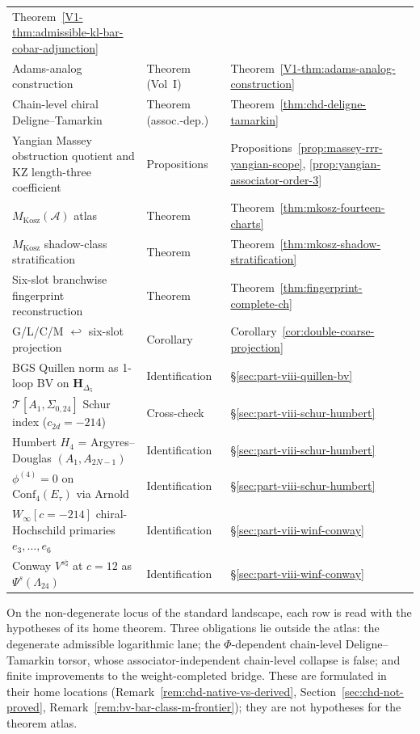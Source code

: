 \begin{center}
\begin{tabular}{@{}p{}p{}p{}@{}}
 Theorem~\ref*{V1-thm:admissible-kl-bar-cobar-adjunction} \\
Adams-analog construction & Theorem (Vol~I) &
 Theorem~\ref*{V1-thm:adams-analog-construction} \\
Chain-level chiral Deligne--Tamarkin & Theorem (assoc.-dep.) &
 Theorem~\ref{thm:chd-deligne-tamarkin} \\
Yangian Massey obstruction quotient and KZ length-three coefficient &
 Propositions &
 Propositions~\ref{prop:massey-rrr-yangian-scope},
 \ref{prop:yangian-associator-order-3} \\
$M_{\mathrm{Kosz}}(\mathcal{A})$ atlas & Theorem &
 Theorem~\ref{thm:mkosz-fourteen-charts} \\
$M_{\mathrm{Kosz}}$ shadow-class stratification & Theorem &
 Theorem~\ref{thm:mkosz-shadow-stratification} \\
Six-slot branchwise fingerprint reconstruction & Theorem &
 Theorem~\ref{thm:fingerprint-complete-ch} \\
G/L/C/M $\hookleftarrow$ six-slot projection & Corollary &
 Corollary~\ref{cor:double-coarse-projection} \\
BGS Quillen norm as 1-loop BV on $\mathbf{H}_{\Delta_5}$ &
 Identification &
 \S\ref{sec:part-viii-quillen-bv} \\
$\mathcal{T}[A_1,\Sigma_{0,24}]$ Schur index ($c_{2d} = -214$) &
 Cross-check &
 \S\ref{sec:part-viii-schur-humbert} \\
Humbert $H_4$ = Argyres--Douglas $(A_1, A_{2N-1})$ &
 Identification &
 \S\ref{sec:part-viii-schur-humbert} \\
$\phi^{(4)} = 0$ on $\mathrm{Conf}_4(E_\tau)$ via Arnold &
 Identification &
 \S\ref{sec:part-viii-schur-humbert} \\
$W_\infty[c=-214]$ chiral-Hochschild primaries $e_3,\ldots,e_6$ &
 Identification &
 \S\ref{sec:part-viii-winf-conway} \\
Conway $V^{s\natural}$ at $c = 12$ as $\Psi^s(\Lambda_{24})$ &
 Identification &
 \S\ref{sec:part-viii-winf-conway} \\
\bottomrule
\end{tabular}
\end{center}

On the non-degenerate locus of the standard landscape, each row is
read with the hypotheses of its home theorem. Three obligations lie
outside the atlas: the degenerate admissible logarithmic lane; the
\(\Phi\)-dependent chain-level Deligne--Tamarkin torsor, whose
associator-independent chain-level collapse is false; and finite
improvements to the weight-completed bridge. These are formulated in
their home locations
(Remark~\ref{rem:chd-native-vs-derived},
Section~\ref{sec:chd-not-proved},
Remark~\ref{rem:bv-bar-class-m-frontier}); they are not hypotheses for
the theorem atlas.

